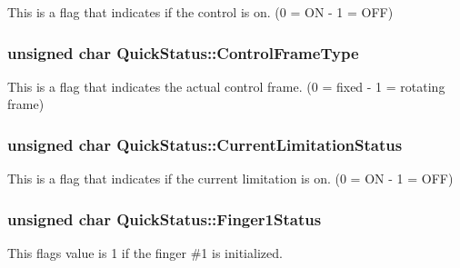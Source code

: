 This is a flag that indicates if the control is on. (0 = ON -\/ 1 = O\+FF) 

\subsubsection[{\texorpdfstring{Control\+Frame\+Type}{ControlFrameType}}]{\setlength{\rightskip}{0pt plus 5cm}unsigned char Quick\+Status\+::\+Control\+Frame\+Type}\hypertarget{struct_quick_status_a2a5b8e7585c34a53436e8bcc1650ea18}{}\label{struct_quick_status_a2a5b8e7585c34a53436e8bcc1650ea18}


This is a flag that indicates the actual control frame. (0 = fixed -\/ 1 = rotating frame) 

\subsubsection[{\texorpdfstring{Current\+Limitation\+Status}{CurrentLimitationStatus}}]{\setlength{\rightskip}{0pt plus 5cm}unsigned char Quick\+Status\+::\+Current\+Limitation\+Status}\hypertarget{struct_quick_status_a8177e27c2aeab753c3fa87fd2c7342c3}{}\label{struct_quick_status_a8177e27c2aeab753c3fa87fd2c7342c3}


This is a flag that indicates if the current limitation is on. (0 = ON -\/ 1 = O\+FF) 

\subsubsection[{\texorpdfstring{Finger1\+Status}{Finger1Status}}]{\setlength{\rightskip}{0pt plus 5cm}unsigned char Quick\+Status\+::\+Finger1\+Status}\hypertarget{struct_quick_status_a8e58f5a35e358178ac17145661aa9fa3}{}\label{struct_quick_status_a8e58f5a35e358178ac17145661aa9fa3}


This flag\textquotesingle{}s value is 1 if the finger \#1 is initialized. 

